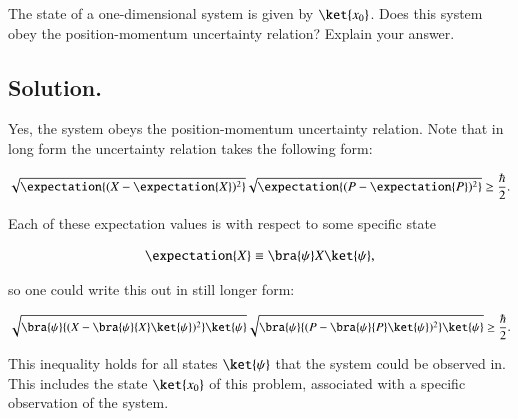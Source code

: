 The state of a one-dimensional system is given by $\ket{x_0}$. Does this system obey the position-momentum uncertainty relation? Explain your answer.

\subsection{Solution.}

Yes, the system obeys the position-momentum uncertainty relation.  Note that in long form the uncertainty relation takes the following form:

\begin{align}\label{eqn:qmIproblemSet1:8}
\sqrt{\expectation{ (X - \expectation{X})^2 }}
\sqrt{\expectation{ (P - \expectation{P})^2 }} \ge \frac{\hbar}{2}.
\end{align}

Each of these expectation values is with respect to some specific state

\begin{align}\label{eqn:qmIproblemSet1:7}
\expectation{ X } \equiv \bra{\psi} X \ket{\psi},
\end{align}

so one could write this out in still longer form:

\begin{align}\label{eqn:qmIproblemSet1:8b}
\sqrt{\bra{\psi}{ (X - \bra{\psi}{X}\ket{\psi})^2 } \ket{\psi} }
\sqrt{\bra{\psi}{ (P - \bra{\psi}{P}\ket{\psi})^2 } \ket{\psi} } \ge \frac{\hbar}{2}.
\end{align}

This inequality holds for all states $\ket{\psi}$ that the system could be observed in.  This includes the state $\ket{x_0}$ of this problem, associated with a specific observation of the system.

\EndArticle
